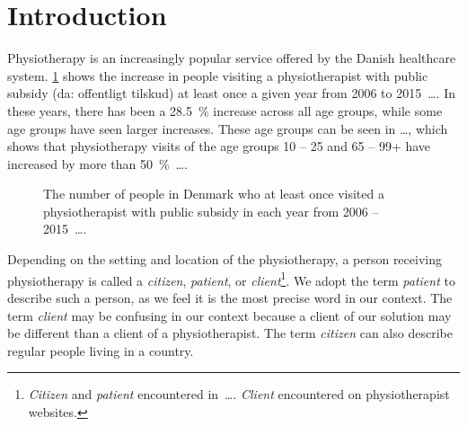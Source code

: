 \section{Introduction}\label{sec:introduction}

Physiotherapy is an increasingly popular service offered by the Danish healthcare system. \cref{fig:physio-visits} shows the increase in people visiting a physiotherapist with public subsidy (da: offentligt tilskud) at least once a given year from 2006 to 2015~\ldots. In these years, there has been a 28.5~\% increase across all age groups, while some age groups have seen larger increases. These age groups can be seen in \ldots, which shows that physiotherapy visits of the age groups 10 -- 25 and 65 -- 99+ have increased by more than 50~\%~\ldots.


\begin{figure}[htb]%
\centering
{}
\caption[Physiotherapist visits in Denmark]{The number of people in Denmark who at least once visited a physiotherapist with public subsidy in each year from 2006 -- 2015~\ldots.}\label{fig:physio-visits}%
\end{figure}

Depending on the setting and location of the physiotherapy, a person receiving physiotherapy is called a \emph{citizen}, \textit{patient}, or \textit{client}\footnote{\emph{Citizen} and \emph{patient} encountered in~\ldots. \emph{Client} encountered on physiotherapist websites.}. We adopt the term \emph{patient} to describe such a person, as we feel it is the most precise word in our context. The term \emph{client} may be confusing in our context because a client of our solution may be different than a client of a physiotherapist. The term \emph{citizen} can also describe regular people living in a country.


